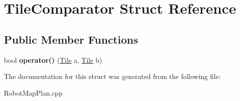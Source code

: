 \hypertarget{struct_tile_comparator}{}\section{Tile\+Comparator Struct Reference}
\label{struct_tile_comparator}
\subsection*{Public Member Functions}
\begin{DoxyCompactItemize}
\item 
\mbox{\label{struct_tile_comparator_a9fc3f2d590c5ac968423b78d340eadf1}} 
bool {\bfseries operator()} (\mbox{\hyperlink{struct_tile}{Tile}} a, \mbox{\hyperlink{struct_tile}{Tile}} b)
\end{DoxyCompactItemize}


The documentation for this struct was generated from the following file\+:\begin{DoxyCompactItemize}
\item 
Robot\+Map\+Plan.\+cpp\end{DoxyCompactItemize}
